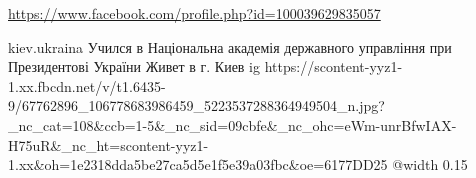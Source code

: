  
 
 
 
 

\url{https://www.facebook.com/profile.php?id=100039629835057}\par
kiev.ukraina
Учился в Національна академія державного управління при Президентові України
Живет в г. Киев
\ifcmt
  ig https://scontent-yyz1-1.xx.fbcdn.net/v/t1.6435-9/67762896_106778683986459_5223537288364949504_n.jpg?_nc_cat=108&ccb=1-5&_nc_sid=09cbfe&_nc_ohc=eWm-unrBfwIAX-H75uR&_nc_ht=scontent-yyz1-1.xx&oh=1e2318dda5be27ca5d5e1f5e39a03fbc&oe=6177DD25
  @width 0.15
\fi


